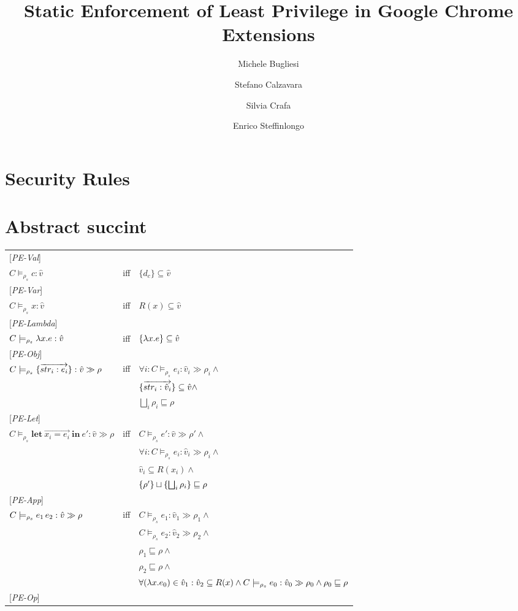 \documentclass[[12pt,a4paper,twoside,openrigh]{article}
\author{Michele Bugliesi \and Stefano Calzavara \and Silvia Crafa \and Enrico Steffinlongo}
\title{Static Enforcement of Least Privilege in Google Chrome Extensions}
\newcommand{\vat}[0]{\hat{v}}
\newcommand{\modelrho}{\models_{\rho_s}}
\newcommand{\letexprs}[3]{\mathbf{let}\ \vec{#1 = #2}\ \mathbf{in}\ #3}
\newcommand{\caesti}[2]{C \modelrho #1 : \vat_{#2} \gg \rho_{#2}}
\newcommand{\caest}[1]{C \modelrho #1 : \vat \gg \rho}
\begin{document}
\maketitle
\tableofcontents

\section{Security Rules}
\section{Abstract succint}
\begin{tabular}{l l l}
{[\textit{PE-Val}]} \\
$C \modelrho c : \vat$ & iff & $\{d_c\} \subseteq \vat$ \\ 
{[\textit{PE-Var}]} \\
$C \modelrho x : \vat$ & iff & $R(x) \subseteq \vat$ \\ 
{[\textit{PE-Lambda}]} \\
$C \modelrho \lam{x}{e} : \vat$ & iff & $\{\lam{x}{e}\} \subseteq \vat$ \\
{[\textit{PE-Obj}]} \\
$\caest {\rec{\vec{str_i : e_i}}}$ & iff & $\forall i: \caesti {e_i} {i} \wedge$\\
&& $\rec{\vec{str_i :\vat_i}} \subseteq \vat \wedge$ \\
&& $\bigsqcup_{i} \rho_i \sqsubseteq \rho$ \\ 
{[\textit{PE-Let}]} \\
$\caest {\letexprs{x_i}{e_i}{e'}}$ & iff & $C \modelrho e' : \vat \gg \rho' \wedge$ \\
&& $ \forall i: \caesti {e_i} {i} \wedge$ \\
&& $\vat_i \subseteq R(x_i) \wedge$ \\
&& $ \{\rho'\} \sqcup \{\bigsqcup_i \rho_i\} \sqsubseteq \rho$ \\
{[\textit{PE-App}]} \\
$\caest {\appl {e_1} {e_2}}$ & iff & $ \caesti {e_1} {1} \wedge$ \\
&& $\caesti {e_2} {2} \wedge$ \\
&& $\rho_1 \sqsubseteq \rho \wedge$ \\
&& $\rho_2 \sqsubseteq \rho \wedge$ \\
&& $\forall (\lam{x}{e_0}) \in \vat_1 : \vat_2 \subseteq R(x) \wedge \caesti {e_0} {0} \wedge \rho_0 \sqsubseteq \rho $\\
{[\textit{PE-Op}]} \\

\end{tabular}
\end{document}
